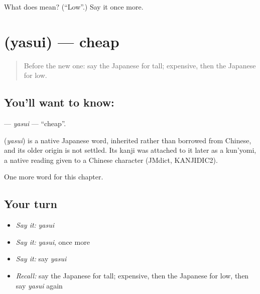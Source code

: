\begin{tcolorbox}[breakable,colback=teal!4,colframe=teal!35!black,title={Before you move on}]
What does  mean? (\textquotedblleft{}Low\textquotedblright{}.) Say it once more.
\end{tcolorbox}
\section[\texorpdfstring{\ja{やすい} (yasui)}{やすい (yasui)}]{ (yasui) — cheap}

\label{lesson:JA-C49-yasui}



\begin{quote}
Before the new one: say the Japanese for tall; expensive, then the Japanese for low.
\end{quote}

\subsection*{You'll want to know: }
\textbf{} — \emph{yasui} — \textquotedblleft{}cheap\textquotedblright{}.

\begin{cousinweb}
\textbf{} (\emph{yasui}) is a native Japanese word, inherited rather than borrowed from Chinese, and its older origin is not settled. Its kanji was attached to it later as a kun'yomi, a native reading given to a Chinese character (JMdict, KANJIDIC2).
\end{cousinweb}

\begin{grammarlens}[title={What you've built}]
One more word for this chapter.
\end{grammarlens}

\subsection*{Your turn}
\begin{itemize}
\raggedright
  \item \emph{Say it:} \emph{yasui}
  \item \emph{Say it:} \emph{yasui}, once more
  \item \emph{Say it:} say \emph{yasui}
  \item \emph{Recall:} say the Japanese for tall; expensive, then the Japanese for low, then say \emph{yasui} again
\end{itemize}

